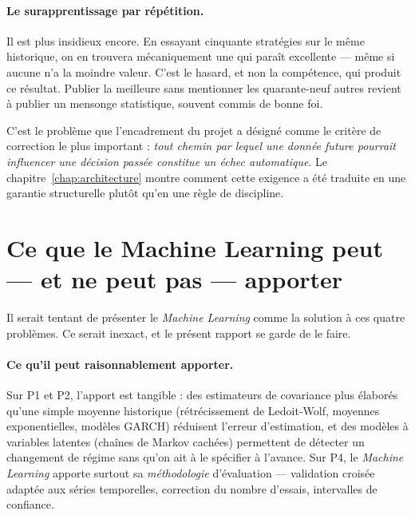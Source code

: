 \paragraph{Le surapprentissage par répétition.} Il est plus insidieux encore. En
essayant cinquante stratégies sur le même historique, on en trouvera
mécaniquement une qui paraît excellente — même si aucune n'a la moindre valeur.
C'est le hasard, et non la compétence, qui produit ce résultat. Publier la
meilleure sans mentionner les quarante-neuf autres revient à publier un mensonge
statistique, souvent commis de bonne foi.

\begin{remarquebox}
C'est le problème que l'encadrement du projet a désigné comme le critère de
correction le plus important : \emph{tout chemin par lequel une donnée future
pourrait influencer une décision passée constitue un échec automatique}. Le
chapitre~\ref{chap:architecture} montre comment cette exigence a été traduite en
une garantie structurelle plutôt qu'en une règle de discipline.
\end{remarquebox}

\section{Ce que le Machine Learning peut — et ne peut pas — apporter}

Il serait tentant de présenter le \emph{Machine Learning} comme la solution à ces
quatre problèmes. Ce serait inexact, et le présent rapport se garde de le faire.

\paragraph{Ce qu'il peut raisonnablement apporter.} Sur P1 et P2, l'apport est
tangible : des estimateurs de covariance plus élaborés qu'une simple moyenne
historique (rétrécissement de Ledoit-Wolf, moyennes exponentielles, modèles
GARCH) réduisent l'erreur d'estimation, et des modèles à variables latentes
(chaînes de Markov cachées) permettent de détecter un changement de régime sans
qu'on ait à le spécifier à l'avance. Sur P4, le \emph{Machine Learning} apporte
surtout sa \emph{méthodologie} d'évaluation — validation croisée adaptée aux
séries temporelles, correction du nombre d'essais, intervalles de confiance.

